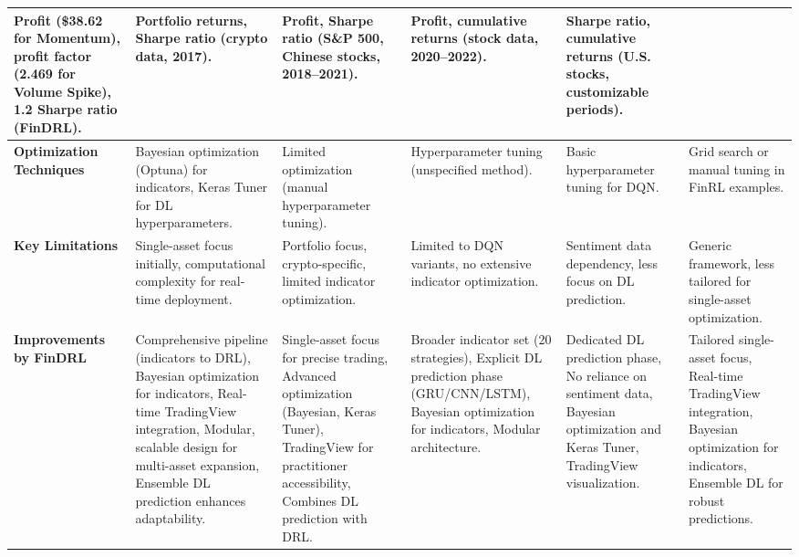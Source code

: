 \begin{table}[h]
\begin{tabular}{| p{2.2cm}|p{2.2cm}|p{2.2cm}|p{2.2cm}|p{2.2cm}|p{2.2cm} |}
Profit (\$38.62 for Momentum), profit factor (2.469 for Volume Spike), 1.2 Sharpe ratio (FinDRL). & 
Portfolio returns, Sharpe ratio (crypto data, 2017). & 
Profit, Sharpe ratio (S\&P 500, Chinese stocks, 2018--2021). & 
Profit, cumulative returns (stock data, 2020--2022). & 
Sharpe ratio, cumulative returns (U.S. stocks, customizable periods). \\
\midrule
\textbf{Optimization Techniques} & 
Bayesian optimization (Optuna) for indicators, Keras Tuner for DL hyperparameters. & 
Limited optimization (manual hyperparameter tuning). & 
Hyperparameter tuning (unspecified method). & 
Basic hyperparameter tuning for DQN. & 
Grid search or manual tuning in FinRL examples. \\
\midrule
\textbf{Key Limitations} & 
Single-asset focus initially, computational complexity for real-time deployment. & 
Portfolio focus, crypto-specific, limited indicator optimization. & 
Limited to DQN variants, no extensive indicator optimization. & 
Sentiment data dependency, less focus on DL prediction. & 
Generic framework, less tailored for single-asset optimization. \\
\midrule
\textbf{Improvements by FinDRL} & 
\begin{minipage}[t]{2.2cm}\vspace{0pt}
Comprehensive pipeline (indicators to DRL), Bayesian optimization for indicators, Real-time TradingView integration, Modular, scalable design for multi-asset expansion, Ensemble DL prediction enhances adaptability.
\end{minipage} & 
\begin{minipage}[t]{2.2cm}\vspace{0pt}
Single-asset focus for precise trading, Advanced optimization (Bayesian, Keras Tuner), TradingView for practitioner accessibility, Combines DL prediction with DRL.
\end{minipage} & 
\begin{minipage}[t]{2.2cm}\vspace{0pt}
Broader indicator set (20 strategies), Explicit DL prediction phase (GRU/CNN/LSTM), Bayesian optimization for indicators, Modular architecture.
\end{minipage} & 
\begin{minipage}[t]{2.2cm}\vspace{0pt}
Dedicated DL prediction phase, No reliance on sentiment data, Bayesian optimization and Keras Tuner, TradingView visualization.
\end{minipage} & 
\begin{minipage}[t]{2.2cm}\vspace{0pt}
Tailored single-asset focus, Real-time TradingView integration, Bayesian optimization for indicators, Ensemble DL for robust predictions.
\end{minipage} \\
\bottomrule
\end{tabular}
\end{table}

